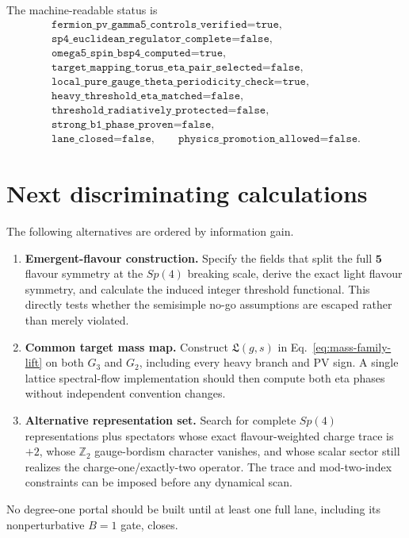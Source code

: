 \documentclass[11pt]{article}
\theoremstyle{definition}
\theoremstyle{remark}
\newcommand{\ZZ}{\mathbb Z}
\begin{document}
The machine-readable status is
\begin{equation}
 \begin{gathered}
 \texttt{fermion\_pv\_gamma5\_controls\_verified=true},\\
 \texttt{sp4\_euclidean\_regulator\_complete=false},\\
 \texttt{omega5\_spin\_bsp4\_computed=true},\\
 \texttt{target\_mapping\_torus\_eta\_pair\_selected=false},\\
 \texttt{local\_pure\_gauge\_theta\_periodicity\_check=true},\\
 \texttt{heavy\_threshold\_eta\_matched=false},\\
 \texttt{threshold\_radiatively\_protected=false},\\
 \texttt{strong\_b1\_phase\_proven=false},\\
 \texttt{lane\_closed=false},\qquad
 \texttt{physics\_promotion\_allowed=false}.
 \end{gathered}
 \label{eq:machine-status}
\end{equation}

\section{Next discriminating calculations}

The following alternatives are ordered by information gain.
\begin{enumerate}
\item \textbf{Emergent-flavour construction.}  Specify the fields that
  split the full \(\bm5\) flavour symmetry at the \(Sp(4)\) breaking scale,
  derive the exact light flavour symmetry, and calculate the induced
  integer threshold functional.  This directly tests whether the
  semisimple no-go assumptions are escaped rather than merely violated.
\item \textbf{Common target mass map.}  Construct
  \(\mathfrak L(g,s)\) in Eq.~\eqref{eq:mass-family-lift} on both
  \(G_3\) and \(G_2\), including every heavy branch and PV sign.  A single
  lattice spectral-flow implementation should then compute both eta
  phases without independent convention changes.
\item \textbf{Alternative representation set.}  Search for complete
  \(Sp(4)\) representations plus spectators whose exact flavour-weighted
  charge trace is \(+2\), whose \(\ZZ_2\) gauge-bordism character vanishes,
  and whose scalar sector still realizes the charge-one/exactly-two
  operator.  The trace and mod-two-index constraints can be imposed before
  any dynamical scan.
\end{enumerate}
No degree-one portal should be built until at least one full lane, including
its nonperturbative \(B=1\) gate, closes.



\end{document}
